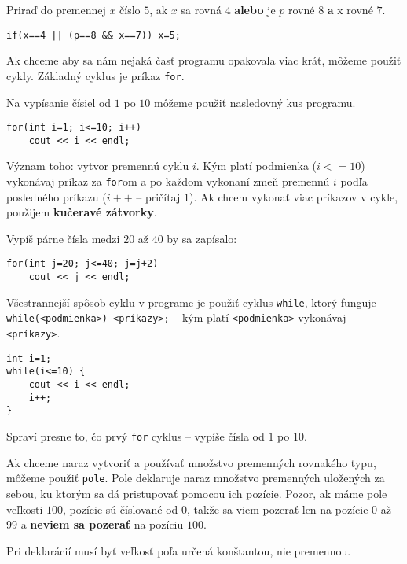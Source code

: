 Priraď do premennej $x$ číslo $5$, ak $x$ sa rovná $4$ \textbf{alebo} je $p$ rovné $8$ \textbf{a} x
rovné $7$.
\begin{lstlisting}
if(x==4 || (p==8 && x==7)) x=5;
\end{lstlisting}


Ak chceme aby sa nám nejaká časť programu opakovala viac krát, môžeme použiť cykly. Základný cyklus
je príkaz \texttt{for}.

Na vypísanie čísiel od $1$ po $10$ môžeme použiť nasledovný kus programu.

\begin{lstlisting}
for(int i=1; i<=10; i++)
    cout << i << endl;
\end{lstlisting}

Význam toho: vytvor premennú cyklu $i$. Kým platí podmienka ($i <= 10$) vykonávaj príkaz za
\texttt{for}om a po každom vykonaní zmeň premennú $i$ podľa posledného príkazu ($i++$ -- pričítaj
$1$). Ak chcem vykonať viac príkazov v cykle, použijem \textbf{kučeravé zátvorky}.

Vypíš párne čísla medzi $20$ až $40$ by sa zapísalo:
\begin{lstlisting}
for(int j=20; j<=40; j=j+2)
    cout << j << endl;
\end{lstlisting}

Všestrannejší spôsob cyklu v programe je použiť cyklus \texttt{while}, ktorý funguje
\texttt{while(<podmienka>) {<príkazy>};} --  kým platí \texttt{<podmienka>} vykonávaj
\texttt{<príkazy>}.

\begin{lstlisting}
int i=1;
while(i<=10) {
    cout << i << endl;
    i++;
}
\end{lstlisting}

Spraví presne to, čo prvý \texttt{for} cyklus -- vypíše čísla od $1$ po $10$.


Ak chceme naraz vytvoriť a používať množstvo premenných rovnakého typu, môžeme použiť \texttt{pole}.
Pole deklaruje naraz množstvo premenných uložených za sebou, ku ktorým sa dá pristupovať pomocou ich
pozície. Pozor, ak máme pole veľkosti $100$, pozície sú číslované od $0$, takže sa viem pozerať len
na pozície $0$ až $99$ a \textbf{neviem sa pozerať} na pozíciu $100$.

Pri deklarácií musí byť veľkosť poľa určená konštantou, nie premennou.

